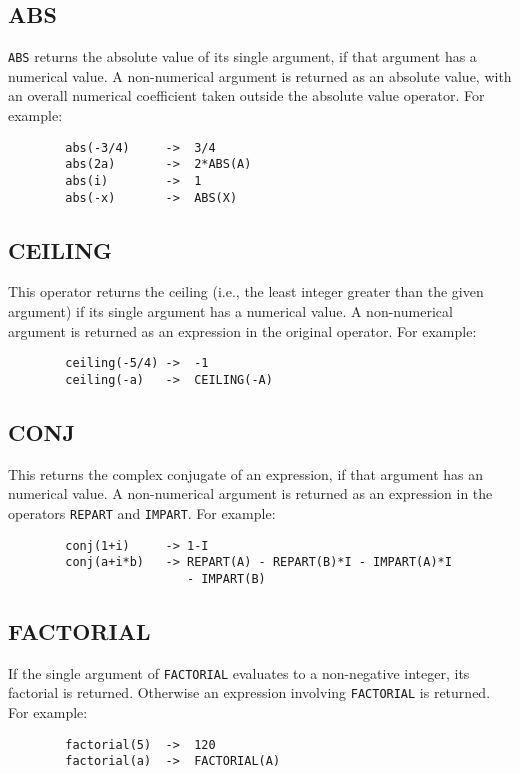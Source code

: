 \subsection{ABS}
{\tt ABS} returns the absolute value
of its single argument, if that argument has a numerical value.
A non-numerical argument is returned as an absolute value, with an overall
numerical coefficient taken outside the absolute value operator. For example:
\begin{verbatim}
        abs(-3/4)     ->  3/4
        abs(2a)       ->  2*ABS(A)
        abs(i)        ->  1
        abs(-x)       ->  ABS(X)
\end{verbatim}

\subsection{CEILING}
This operator returns the ceiling (i.e., the least integer greater than
the given argument) if its single argument has a numerical value.  A
non-numerical argument is returned as an expression in the original
operator.  For example:

\begin{verbatim}
        ceiling(-5/4) ->  -1
        ceiling(-a)   ->  CEILING(-A)
\end{verbatim}

\subsection{CONJ}
This returns the complex conjugate
of an expression, if that argument has an numerical value.  A
non-numerical argument is returned as an expression in the operators
{\tt REPART} and {\tt IMPART}. For example:
\begin{verbatim}
        conj(1+i)     -> 1-I
        conj(a+i*b)   -> REPART(A) - REPART(B)*I - IMPART(A)*I
                         - IMPART(B)
\end{verbatim}

\subsection{FACTORIAL}

If the single argument of {\tt FACTORIAL} evaluates to a non-negative
integer, its factorial is returned.  Otherwise an expression involving
{\tt FACTORIAL} is returned. For example:
\begin{verbatim}
        factorial(5)  ->  120
        factorial(a)  ->  FACTORIAL(A)
\end{verbatim}

